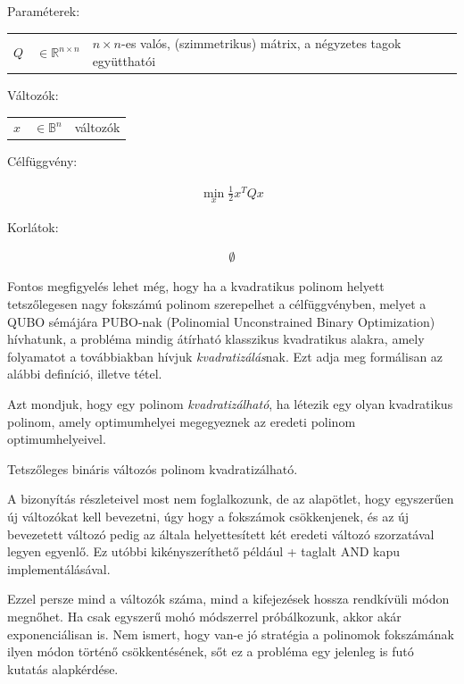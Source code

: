 Paraméterek:

\begin{tabular}{lll}
	$Q$ & $\in \mathbb{R}^{n×n}$  & $n × n$-es valós, (szimmetrikus) mátrix, a négyzetes tagok együtthatói \\
\end{tabular}

Változók:

\begin{tabular}{lll}
	$x$ & $\in \mathbb{B}^n$ & változók \\
\end{tabular}

Célfüggvény:

\begin{align}
	\min_{x} \frac{1}{2} x^T Q x
\end{align}

Korlátok:

\begin{align}
	\emptyset
\end{align}

Fontos megfigyelés lehet még, hogy ha a kvadratikus polinom helyett tetszőlegesen nagy fokszámú polinom szerepelhet a célfüggvényben, melyet a QUBO sémájára PUBO-nak (Polinomial Unconstrained Binary Optimization) hívhatunk, a probléma mindig átírható klasszikus kvadratikus alakra, amely folyamatot a továbbiakban hívjuk \textit{kvadratizálás}nak. Ezt adja meg formálisan az alábbi definíció, illetve tétel.

\begin{definition}[Kvadratizálhatóság]\label{def:kvadratizalhato}
	Azt mondjuk, hogy egy polinom \textit{kvadratizálható}, ha létezik egy olyan kvadratikus polinom, amely optimumhelyei megegyeznek az eredeti polinom optimumhelyeivel.
\end{definition}

\begin{allitas}\label{theorem:kvadratizalhato}
	Tetszőleges bináris változós polinom kvadratizálható.
	
	A bizonyítás részleteivel most nem foglalkozunk, de az alapötlet, hogy egyszerűen új változókat kell bevezetni, úgy hogy a fokszámok csökkenjenek, és az új bevezetett változó pedig az általa helyettesített két eredeti változó szorzatával legyen egyenlő. Ez utóbbi kikényszeríthető például \az+ taglalt AND kapu implementálásával.
\end{allitas}
	 
Ezzel persze mind a változók száma, mind a kifejezések hossza rendkívüli módon megnőhet. Ha csak egyszerű mohó módszerrel próbálkozunk, akkor akár exponenciálisan is. Nem ismert, hogy van-e jó stratégia a polinomok fokszámának ilyen módon történő csökkentésének, sőt ez a probléma egy jelenleg is futó kutatás alapkérdése.

